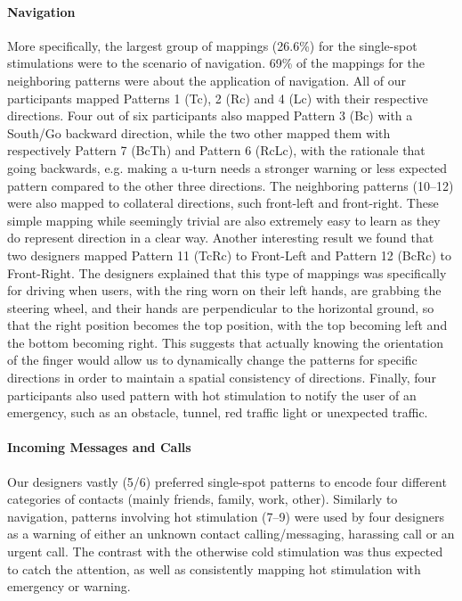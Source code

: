 \documentclass[preprint,12pt]{elsarticle}
\begin{document}
\paragraph{Navigation}
More specifically, the largest group of mappings (26.6\%) for the single-spot stimulations were to the scenario of navigation.
69\% of the mappings for the neighboring patterns were about the application of navigation.
All of our participants mapped Patterns 1 (Tc), 2 (Rc) and 4 (Lc) with their respective directions. Four out of six participants also mapped Pattern 3 (Bc) with a South/Go backward direction, while the two other mapped them with respectively Pattern 7 (BcTh) and Pattern 6 (RcLc), with the rationale that going backwards, e.g. making a u-turn needs a stronger warning or less expected pattern compared to the other three directions.
The neighboring patterns (10--12) were also mapped to collateral directions, such front-left and front-right.
These simple mapping while seemingly trivial are also extremely easy to learn as they do represent direction in a clear way.
Another interesting result we found that two designers mapped Pattern 11 (TcRc) to Front-Left and Pattern 12 (BcRc) to Front-Right.
The designers explained that this type of mappings was specifically for driving when users, with the ring worn on their left hands, are grabbing the steering wheel, and their hands are perpendicular to the horizontal ground, so that the right position becomes the top position, with the top becoming left and the bottom becoming right.
This suggests that actually knowing the orientation of the finger would allow us to dynamically change the patterns for specific directions in order to maintain a spatial consistency of directions.
Finally, four participants also used pattern with hot stimulation to notify the user of an emergency, such as an obstacle, tunnel, red traffic light or unexpected traffic.

\paragraph{Incoming Messages and Calls}
Our designers vastly (5/6) preferred single-spot patterns to encode four different categories of contacts (mainly friends, family, work, other).
Similarly to navigation, patterns involving hot stimulation (7--9) were used by four designers as a warning of either an unknown contact calling/messaging, harassing call or an urgent call.
The contrast with the otherwise cold stimulation was thus expected to catch the attention, as well as consistently mapping hot stimulation with emergency or warning.
\end{document}
